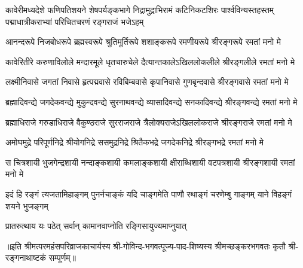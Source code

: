 
{कावेरीमध्यदेशे फणिपतिशयने शेषपर्यङ्कभागे}
{निद्रामुद्राभिरामं कटिनिकटशिरः पार्श्वविन्यस्तहस्तम्}
{पद्माधात्रीकराभ्यां परिचितचरणं रङ्गराजं भजेऽहम्}

\fourlineindentedshloka
{आनन्दरूपे  निजबोधरूपे}
{ब्रह्मस्वरूपे श्रुतिमूर्तिरूपे}
{शशाङ्करूपे रमणीयरूपे}
{श्रीरङ्गरूपे रमतां मनो मे}

\fourlineindentedshloka
{कावेरितीरे करुणाविलोले}
{मन्दारमूले धृतचारुचेले}
{दैत्यान्तकालेऽखिललोकलीले}
{श्रीरङ्गलीले रमतां मनो मे}

\fourlineindentedshloka
{लक्ष्मीनिवासे जगतां निवासे}
{हृत्पद्मवासे रविबिम्बवासे}
{कृपानिवासे गुणबृन्दवासे}
{श्रीरङ्गवासे रमतां मनो मे}


\fourlineindentedshloka
{ब्रह्मादिवन्द्ये जगदेकवन्द्ये}
{मुकुन्दवन्द्ये सुरनाथवन्द्ये}
{व्यासादिवन्द्ये सनकादिवन्द्ये}
{श्रीरङ्गवन्द्ये रमतां मनो मे}

\fourlineindentedshloka
{ब्रह्माधिराजे गरुडाधिराजे}
{वैकुण्ठराजे सुरराजराजे}
{त्रैलोक्यराजेऽखिललोकराजे}
{श्रीरङ्गराजे रमतां मनो मे}

\fourlineindentedshloka
{अमोघमुद्रे परिपूर्णनिद्रे}
{श्रीयोगनिद्रे ससमुद्रनिद्रे}
{श्रितैकभद्रे जगदेकनिद्रे}
{श्रीरङ्गभद्रे रमतां मनो मे}


\fourlineindentedshloka
{स चित्रशायी भुजगेन्द्रशायी}
{नन्दाङ्कशायी कमलाङ्कशायी}
{क्षीराब्धिशायी वटपत्रशायी}
{श्रीरङ्गशायी रमतां मनो मे}


\fourlineindentedshloka
{इदं हि रङ्गं त्यजतामिहाङ्गम्}
{पुनर्नचाङ्कं यदि चाङ्गमेति}
{पाणौ रथाङ्गं चरणेम्बु गाङ्गम्}
{याने विहङ्गं शयने भुजङ्गम्}


{प्रातरुत्थाय यः पठेत्}
{सर्वान् कामानवाप्नोति}
{रङ्गिसायुज्यमाप्नुयात्}

{॥इति श्रीमत्परमहंसपरिव्राजकाचार्यस्य श्री-गोविन्द-भगवत्पूज्य-पाद-शिष्यस्य
श्रीमच्छङ्करभगवतः कृतौ श्री-रङ्गनाथाष्टकं सम्पूर्णम्॥}